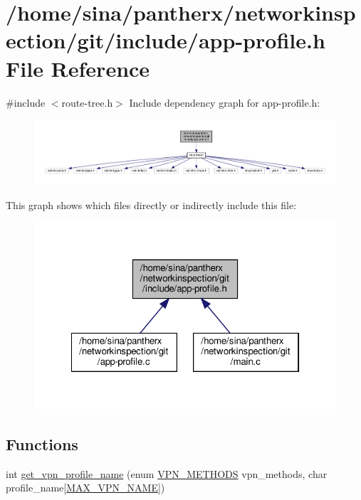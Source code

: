 \hypertarget{app-profile_8h}{}\section{/home/sina/pantherx/networkinspection/git/include/app-\/profile.h File Reference}
\label{app-profile_8h}
{\ttfamily \#include $<$route-\/tree.\+h$>$}\newline
Include dependency graph for app-\/profile.h\+:\nopagebreak
\begin{figure}[H]
\begin{center}
\leavevmode
\includegraphics[width=350pt]{app-profile_8h__incl}
\end{center}
\end{figure}
This graph shows which files directly or indirectly include this file\+:\nopagebreak
\begin{figure}[H]
\begin{center}
\leavevmode
\includegraphics[width=322pt]{app-profile_8h__dep__incl}
\end{center}
\end{figure}
\subsection*{Functions}
\begin{DoxyCompactItemize}
\item 
int \hyperlink{app-profile_8h_a568d74dfa94c9cd629fa492a431fcbf5}{get\+\_\+vpn\+\_\+profile\+\_\+name} (enum \hyperlink{route-tree_8h_a5b876670828c4e38106ba1c6d91024b7}{V\+P\+N\+\_\+\+M\+E\+T\+H\+O\+DS} vpn\+\_\+methods, char profile\+\_\+name\mbox{[}\hyperlink{route-tree_8h_a77ed9a5f9670b7a2d69c376d1199eddf}{M\+A\+X\+\_\+\+V\+P\+N\+\_\+\+N\+A\+ME}\mbox{]})
\end{DoxyCompactItemize}


